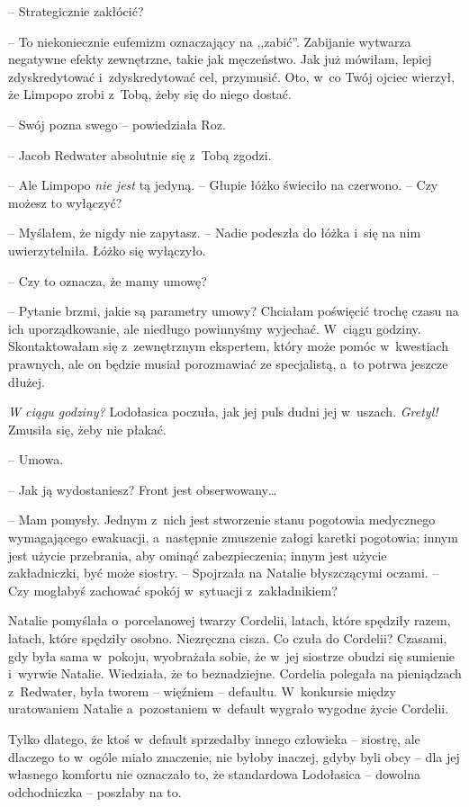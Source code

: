 \documentclass[oneside,polish,11pt,sfheadings]{mwbk}
\begin{document}
-- Strategicznie zakłócić?

-- To niekoniecznie eufemizm oznaczający na ,,zabić''. Zabijanie wytwarza
negatywne efekty zewnętrzne, takie jak męczeństwo. Jak już mówiłam,
lepiej zdyskredytować i~zdyskredytować cel, przymusić. Oto, w~co Twój
ojciec wierzył, że Limpopo zrobi z~Tobą, żeby się do niego dostać.

-- Swój pozna swego -- powiedziała Roz.

-- Jacob Redwater absolutnie się z~Tobą zgodzi.

-- Ale Limpopo \textit{nie jest }tą jedyną. -- Głupie łóżko świeciło na
czerwono. -- Czy możesz to wyłączyć?

-- Myślałem, że nigdy nie zapytasz. -- Nadie podeszła do łóżka i~się na
nim uwierzytelniła. Łóżko się wyłączyło.

-- Czy to oznacza, że mamy umowę?

-- Pytanie brzmi, jakie są parametry umowy? Chciałam poświęcić trochę
czasu na ich uporządkowanie, ale niedługo powinnyśmy wyjechać. W~ciągu
godziny. Skontaktowałam się z~zewnętrznym ekspertem, który może pomóc w~kwestiach prawnych, ale on będzie musiał porozmawiać ze specjalistą, a~to potrwa jeszcze dłużej.

\textit{W ciągu godziny?} Lodołasica poczuła, jak jej puls dudni jej w~uszach. \textit{Gretyl! }Zmusiła się, żeby nie płakać.

-- Umowa.

-- Jak ją wydostaniesz? Front jest obserwowany\ldots 

-- Mam pomysły. Jednym z~nich jest stworzenie stanu pogotowia medycznego
wymagającego ewakuacji, a~następnie zmuszenie załogi karetki pogotowia;
innym jest użycie przebrania, aby ominąć zabezpieczenia; innym jest
użycie zakładniczki, być może siostry. -- Spojrzała na Natalie
błyszczącymi oczami. -- Czy mogłabyś zachować spokój w~sytuacji z~zakładnikiem?

Natalie pomyślała o~porcelanowej twarzy Cordelii, latach, które spędziły
razem, latach, które spędziły osobno. Niezręczna cisza. Co czuła do
Cordelii? Czasami, gdy była sama w~pokoju, wyobrażała sobie, że w~jej
siostrze obudzi się sumienie i~wyrwie Natalie. Wiedziała, że to
beznadziejne. Cordelia polegała na pieniądzach z~Redwater, była tworem -- więźniem -- defaultu. W~konkursie między uratowaniem Natalie a~pozostaniem w~default wygrało wygodne życie Cordelii.

Tylko dlatego, że ktoś w~default sprzedałby innego człowieka -- siostrę,
ale dlaczego to w~ogóle miało znaczenie, nie byłoby inaczej, gdyby byli
obcy -- dla jej własnego komfortu nie oznaczało to, że standardowa
Lodołasica -- dowolna odchodniczka -- poszłaby na to.
\end{document}
